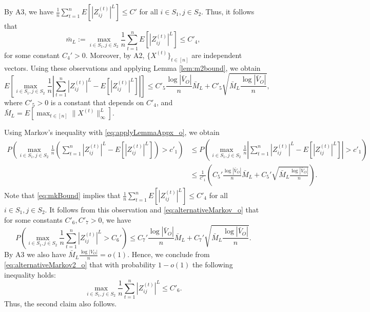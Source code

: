 \documentclass[opre,nonblindrev]{informs3} %
\begin{document}
\begin{APPENDIX}{}
 	
 	By A3,  we have 
 	$\frac{1}{n}\sum_{t=1}^nE[|Z^{(t)}_{ij}|^L]\leq C'$  for
 	all
 	$ i\in S_1,j \in S_2 $.
 	Thus, it follows that
 	\begin{equation} \label{eq:mkBound}
 	\bar{m}_L:=\max_{ i\in S_1,j \in S_2 } \frac{1}{n} \sum_{t=1}^n E[|Z^{(t)}_{ij}|^L]
 	\leq
 	C'_4,
 	\end{equation}
 	for some constant $C_4'>0$.
 	Moreover, by A2, $\{X^{(t)}\}_{t\in[n]}$ are independent vectors.
 	Using these observations and applying
 	Lemma \ref{lem:m2bound}, we obtain
 	\begin{equation}\label{eq:applyLemmaAppx_o}
 	{E}\left[\max_{ i\in S_1,j \in S_2 } \frac{1}{n}\left|\sum_{t=1}^n|Z^{(t)}_{ij}|^L-{E}[|Z^{(t)}_{ij}|^L]\right|\right] \leq
 	C'_5 \frac{\log  |\bar{V}_O| }{n}
 	\bar{M}_{L}+C'_5\sqrt{\bar{M}_{L} \frac{\log  |\bar{V}_O|}{n}},
 	\end{equation}
 	where $C'_5 > 0$ is a constant that depends on $C'_4$, and
 	$\bar{M}_L=E[\max_{t\in[n] } \|X^{(t)}\|_\infty^L ]$.

 	
 	
 	Using Markov's inequality with 	\eqref{eq:applyLemmaAppx_o}, we obtain
 	\begin{equation}\label{eq:alternativeMarkov_o}
 	\begin{aligned}
 	P\left(
 	\max_{ i\in S_1,j \in S_2 }  \frac{1}{n}\left(\sum_{t=1}^n|Z^{(t)}_{ij}|^L-{E}[|Z^{(t)}_{ij}|^L]\right) >c'_1
 	\right)
 	&\leq
 	P\left(
 	\max_{ i\in S_1,j \in S_2 }  \frac{1}{n}\left| \sum_{t=1}^n|Z^{(t)}_{ij}|^L-{E}[|Z^{(t)}_{ij}|^L]\right| >c'_1
 	\right)
 	\\
 	&\leq \frac{1}{c'_1}\left(
 	C_5' \frac{\log  |\bar{V}_O| }{n} \bar M_{L}+C_5'\sqrt{ \bar M_{L} \frac{\log  |\bar{V}_O|}{n}}\right).
 	\end{aligned}
 	\end{equation}
 	Note that 
 	\eqref{eq:mkBound}
 	implies that $\frac{1}{n}\sum_{t=1}^n{E}[|Z^{(t)}_{ij}|^L] \leq C'_4$
 	for all
 	$ i\in S_1,j \in S_2 $.
 	It follows from this observation and
 	\eqref{eq:alternativeMarkov_o} that for some constants $C'_6,C'_7>0$, we have
 	\begin{equation}\label{eq:alternativeMarkov2_o}
 	P\left(
 	\max_{ i\in S_1,j \in S_2 }
 	\frac{1}{n}\sum_{t=1}^n|Z^{(t)}_{ij}|^L >C_6'
 	\right) \leq
 	C_7' \frac{\log  |\bar{V}_O| }{n} \bar M_{L}+C_7'\sqrt{\bar M_{L} \frac{\log  |\bar{V}_O|}{n}} .
 	\end{equation}
 	By A3 we also have $\bar M_{L} \frac{\log  |{V}_O|}{n} = o(1)$.
 	Hence, we conclude from \eqref{eq:alternativeMarkov2_o} that
 	with probability $1-o(1)$ the following inequality holds:
 	\begin{equation}\label{eq:boundedXtrSq_o}
 	\max_{ i\in S_1,j \in S_2 }
 	\frac{1}{n}\sum_{t=1}^n|Z^{(t)}_{ij}|^L
 	\leq C'_6.
 	\end{equation}
 	Thus, the second claim also follows.
 	\hfill\halmos
 	\endproof
 	

\end{APPENDIX}
\end{document}
